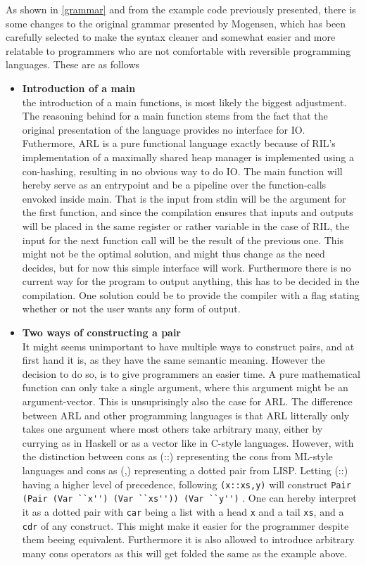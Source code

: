 \documentclass[a4paper]{article}
\begin{document}
As shown in \ref{grammar} and from the example code previously presented, there is some changes to the original grammar presented by Mogensen, which has been carefully selected to make the syntax cleaner and somewhat easier and more relatable to programmers who are not comfortable with reversible programming languages. These are as follows
\begin{itemize}
\item \textbf{Introduction of a main}\\
the introduction of a main functions, is most likely the biggest adjustment. The reasoning behind for a main function stems from the fact that the original presentation of the language provides no interface for IO. Futhermore, ARL is a pure functional language exactly because of RIL's implementation of a maximally shared heap manager is implemented using a con-hashing, resulting in no obvious way to do IO. The main function will hereby serve as an entrypoint and be a pipeline over the function-calls envoked inside main. That is the input from stdin will be the argument for the first function, and since the compilation ensures that inputs and outputs will be placed in the same register or rather variable in the case of RIL, the input for the next function call will be the result of the previous one. This might not be the optimal solution, and might thus change as the need decides, but for now this simple interface will work. Furthermore there is no current way for the program to output anything, this has to be decided in the compilation. One solution could be to provide the compiler with a flag stating whether or not the user wants any form of output.
\item \textbf{Two ways of constructing a pair}\\
It might seems unimportant to have multiple ways to construct pairs, and at first hand it is, as they have the same semantic meaning. However the decision to do so, is to give programmers an easier time. A pure mathematical function can only take a single argument, where this argument might be an argument-vector. This is unsuprisingly also the case for ARL. The difference between ARL and other programming languages is that ARL litterally only takes one argument where most others take arbitrary many, either by currying as in Haskell or as a vector like in C-style languages. However, with the distinction between cons as (::) representing the cons from ML-style languages and cons as (,) representing a dotted pair from LISP. Letting (::) having a higher level of precedence, following \verb+(x::xs,y)+ will construct  \verb+Pair (Pair (Var ``x'') (Var ``xs'')) (Var ``y'')+ . One can hereby interpret it as a dotted pair with \texttt{car} being a list with a head \texttt{x} and a tail \texttt{xs}, and a \texttt{cdr} of any construct. This might make it easier for the programmer despite them beeing equivalent. Furthermore it is also allowed to introduce arbitrary many cons operators as this will get folded the same as the example above.

\end{itemize}
\end{document}
